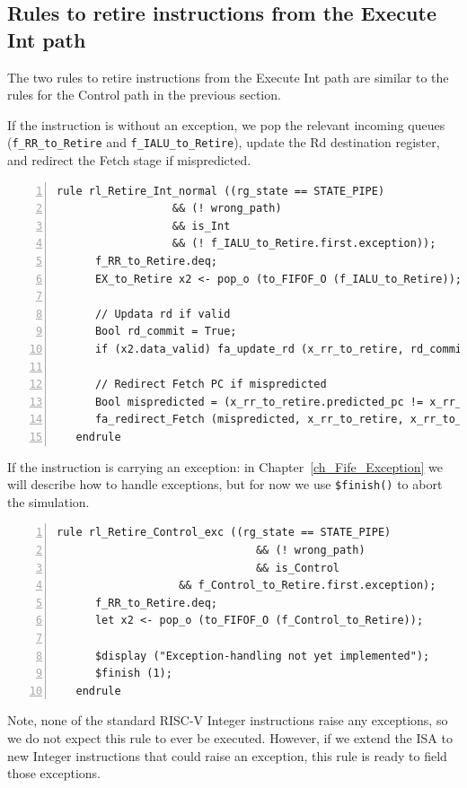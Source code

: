 \subsection{Rules to retire instructions from the Execute Int path}

The two rules to retire instructions from the Execute Int path are
similar to the rules for the Control path in the previous section.

If the instruction is without an exception, we pop the relevant
incoming queues (\verb|f_RR_to_Retire| and \verb|f_IALU_to_Retire|),
update the Rd destination register, and redirect the Fetch stage if
mispredicted.

{\small
\begin{Verbatim}[frame=single, numbers=left, label=(In file:src\_Fife/S5\_Retire.bsv)]
   rule rl_Retire_Int_normal ((rg_state == STATE_PIPE)
			      && (! wrong_path)
			      && is_Int
			      && (! f_IALU_to_Retire.first.exception));
      f_RR_to_Retire.deq;
      EX_to_Retire x2 <- pop_o (to_FIFOF_O (f_IALU_to_Retire));

      // Updata rd if valid
      Bool rd_commit = True;
      if (x2.data_valid) fa_update_rd (x_rr_to_retire, rd_commit, x2.data);

      // Redirect Fetch PC if mispredicted
      Bool mispredicted = (x_rr_to_retire.predicted_pc != x_rr_to_retire.fallthru_pc);
      fa_redirect_Fetch (mispredicted, x_rr_to_retire, x_rr_to_retire.fallthru_pc);
   endrule
\end{Verbatim}
}

If the instruction is carrying an exception: in
Chapter~\ref{ch_Fife_Exception} we will describe how to handle
exceptions, but for now we use \verb|$finish()| to abort the
simulation.

{\small
\begin{Verbatim}[frame=single, numbers=left, label=(In file:src\_Fife/S5\_Retire.bsv)]
   rule rl_Retire_Control_exc ((rg_state == STATE_PIPE)
                               && (! wrong_path)
                               && is_Control
			       && f_Control_to_Retire.first.exception);
      f_RR_to_Retire.deq;
      let x2 <- pop_o (to_FIFOF_O (f_Control_to_Retire));

      $display ("Exception-handling not yet implemented");
      $finish (1);
   endrule
\end{Verbatim}
}

Note, none of the standard RISC-V Integer instructions raise any
exceptions, so we do not expect this rule to ever be
executed. However, if we extend the ISA to new Integer instructions
that could raise an exception, this rule is ready to field those
exceptions.


